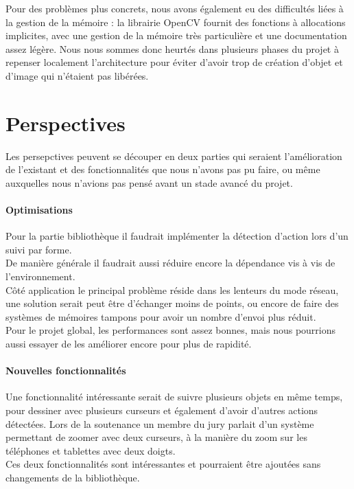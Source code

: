 \documentclass{report}
\begin{document}
		Pour des problèmes plus concrets, nous avons également eu des difficultés liées à la gestion de la mémoire : la librairie OpenCV fournit des fonctions à allocations implicites, avec une gestion de la mémoire très particulière et une documentation assez légère. Nous nous sommes donc heurtés dans plusieurs phases du projet à repenser localement l'architecture pour éviter d'avoir trop de création d'objet et d'image qui n'étaient pas libérées. \\
		
		\section{Perspectives}
		Les persepctives peuvent se découper en deux parties qui seraient l'amélioration de l'existant et des fonctionnalités que nous n'avons pas pu faire, ou même auxquelles nous n'avions pas pensé avant un stade avancé du projet. \\
		
		\paragraph{Optimisations}
		Pour la partie bibliothèque il faudrait implémenter la détection d'action lors d'un suivi par forme. \\
		De manière générale il faudrait aussi réduire encore la dépendance vis à vis de l'environnement. \\
		Côté application le principal problème réside dans les lenteurs du mode réseau, une solution serait peut être d'échanger moins de points, ou encore de faire des systèmes de mémoires tampons pour avoir un nombre d'envoi plus réduit. \\
		
		Pour le projet global, les performances sont assez bonnes, mais nous pourrions aussi essayer de les améliorer encore pour plus de rapidité. \\ 
		
		\paragraph{Nouvelles fonctionnalités}
		Une fonctionnalité intéressante serait de suivre plusieurs objets en même temps, pour dessiner avec plusieurs curseurs et également d'avoir d'autres actions détectées. Lors de la soutenance un membre du jury parlait d'un système permettant de zoomer avec deux curseurs, à la manière du zoom sur les téléphones et tablettes avec deux doigts. \\
Ces deux fonctionnalités sont intéressantes et pourraient être ajoutées sans changements de la bibliothèque. \\		
\end{document}
